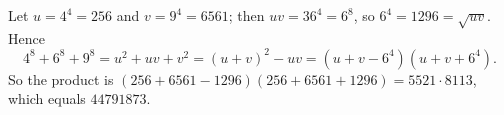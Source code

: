 Let $u=4^4=256$ and $v=9^4=6561$; then $uv=36^4=6^8$, so $6^4=1296=\sqrt{uv}$. Hence
\[4^8+6^8+9^8=u^2+uv+v^2=(u+v)^2-uv=\left(u+v-6^4\right)\left(u+v+6^4\right).\]
So the product is $(256+6561-1296)(256+6561+1296)=\boxed{5521\cdot8113}$, which equals $44791873$.
